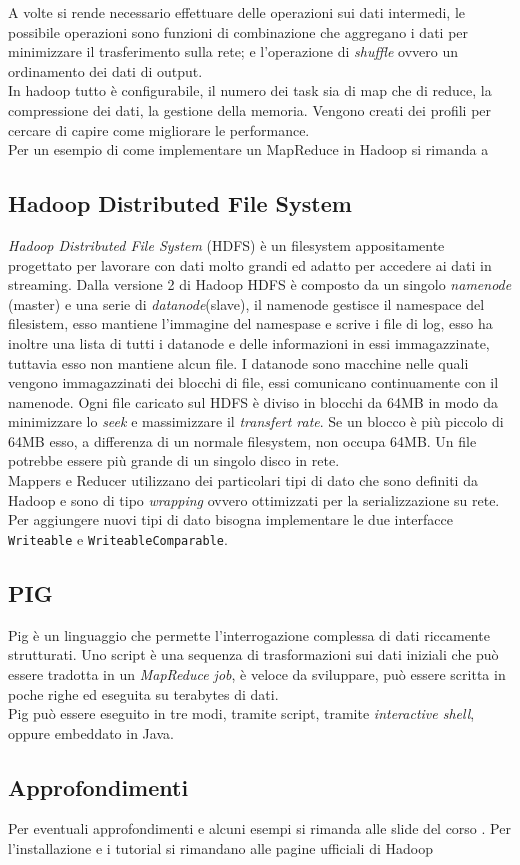 A volte si rende necessario effettuare delle operazioni sui dati intermedi, le possibile operazioni sono funzioni di combinazione che aggregano i dati per minimizzare il trasferimento sulla rete; e l'operazione di \emph{shuffle} ovvero un ordinamento dei dati di output.\\
In hadoop tutto è configurabile, il numero dei task sia di map che di reduce, la compressione dei dati, la gestione della memoria. Vengono creati dei profili per cercare di capire come migliorare le performance.\\
Per un esempio di come implementare un MapReduce in Hadoop si rimanda a \cite{cugola:hadoop}
\subsection{Hadoop Distributed File System}
\emph{Hadoop Distributed File System} (HDFS) è un filesystem appositamente progettato per lavorare con dati molto grandi ed adatto per accedere ai dati in streaming.
Dalla versione 2 di Hadoop HDFS è composto da un singolo \emph{namenode} (master) e una serie di \emph{datanode}(slave), il namenode gestisce il namespace del filesistem, esso mantiene l'immagine del namespase e scrive i file di log, esso ha inoltre una lista di tutti i datanode e delle informazioni in essi immagazzinate, tuttavia esso non mantiene alcun file.
I datanode sono macchine nelle quali vengono immagazzinati dei blocchi di file, essi comunicano continuamente con il namenode. Ogni file caricato sul HDFS è diviso in blocchi da 64MB in modo da minimizzare lo \emph{seek} e massimizzare il \emph{transfert rate}. Se un blocco è più piccolo di 64MB esso, a differenza di un normale filesystem, non occupa 64MB. Un file potrebbe essere più grande di un singolo disco in rete.\\
Mappers e Reducer utilizzano dei particolari tipi di dato che sono definiti da Hadoop e sono di tipo \emph{wrapping} ovvero ottimizzati per la serializzazione su rete. Per aggiungere nuovi tipi di dato bisogna implementare le due interfacce \texttt{Writeable} e \texttt{WriteableComparable}.
\subsection{PIG}
Pig è un linguaggio che permette l'interrogazione complessa di dati riccamente strutturati. Uno script è una sequenza di trasformazioni sui dati iniziali che può essere tradotta in un \emph{MapReduce job}, è veloce da sviluppare, può essere scritta in poche righe ed eseguita su terabytes di dati.\\
Pig può essere eseguito in tre modi, tramite script, tramite \emph{interactive shell}, oppure embeddato in Java.
\subsection{Approfondimenti}
Per eventuali approfondimenti e alcuni esempi si rimanda alle slide del corso \cite{cugola:hadoop}. Per l'installazione e i tutorial si rimandano alle pagine ufficiali di Hadoop \cite{hadoop:docs} \cite{hadoop:tutorials}